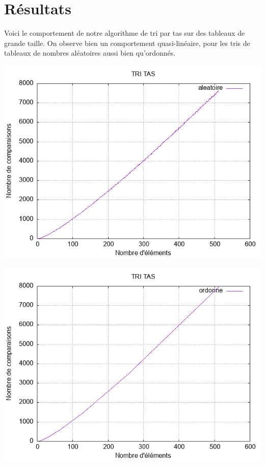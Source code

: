 \documentclass[11pt]{article}
\begin{document}
\section{Résultats}
Voici le comportement de notre algorithme de tri par tas sur des tableaux de grande taille.
On observe bien un comportement quasi-linéaire, pour les tris de tableaux de nombres aléatoires aussi bien qu'ordonnés. 

\begin{center}
\includegraphics[scale=0.6]{images/Tri_tas_aleatoire_cmp.png}
\end{center}

\begin{center}
\includegraphics[scale=0.6]{images/Tri_tas_ordonne_cmp.png}
\end{center}
\end{document}
